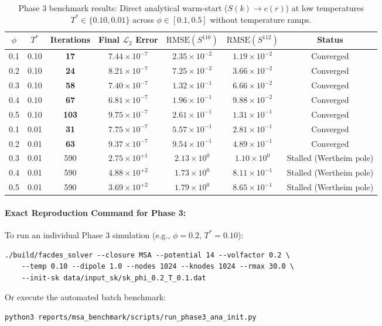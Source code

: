\documentclass[11pt,a4paper]{article}
\begin{document}
\begin{table}[htbp]
    \centering
    \caption{Phase 3 benchmark results: Direct analytical warm-start ($S(k) \to c(r)$) at low temperatures $T^* \in \{0.10, 0.01\}$ across $\phi \in [0.1, 0.5]$ without temperature ramps.}
    \label{tab:phase3_results}
    \vspace{2mm}
    \begin{tabular}{ccccccc}
        \hline\hline
        $\phi$ & $T^*$ & Iterations & Final $\mathcal{L}_2$ Error & $\text{RMSE}(S^{110})$ & $\text{RMSE}(S^{112})$ & Status \\
        \hline
        0.1 & 0.10 & \textbf{17}  & $7.44 \times 10^{-7}$ & $2.35 \times 10^{-2}$ & $1.19 \times 10^{-2}$ & Converged \\
        0.2 & 0.10 & \textbf{24}  & $8.21 \times 10^{-7}$ & $7.25 \times 10^{-2}$ & $3.66 \times 10^{-2}$ & Converged \\
        0.3 & 0.10 & \textbf{58}  & $7.40 \times 10^{-7}$ & $1.32 \times 10^{-1}$ & $6.66 \times 10^{-2}$ & Converged \\
        0.4 & 0.10 & \textbf{67}  & $6.81 \times 10^{-7}$ & $1.96 \times 10^{-1}$ & $9.88 \times 10^{-2}$ & Converged \\
        0.5 & 0.10 & \textbf{103} & $9.75 \times 10^{-7}$ & $2.61 \times 10^{-1}$ & $1.31 \times 10^{-1}$ & Converged \\
        \hline
        0.1 & 0.01 & \textbf{31}  & $7.75 \times 10^{-7}$ & $5.57 \times 10^{-1}$ & $2.81 \times 10^{-1}$ & Converged \\
        0.2 & 0.01 & \textbf{63}  & $9.37 \times 10^{-7}$ & $9.54 \times 10^{-1}$ & $4.89 \times 10^{-1}$ & Converged \\
        0.3 & 0.01 & 590 & $2.75 \times 10^{+1}$ & $2.13 \times 10^{0}$  & $1.10 \times 10^{0}$  & Stalled (Wertheim pole) \\
        0.4 & 0.01 & 590 & $4.88 \times 10^{+2}$ & $1.73 \times 10^{0}$  & $8.11 \times 10^{-1}$ & Stalled (Wertheim pole) \\
        0.5 & 0.01 & 590 & $3.69 \times 10^{+2}$ & $1.79 \times 10^{0}$  & $8.65 \times 10^{-1}$ & Stalled (Wertheim pole) \\
        \hline\hline
    \end{tabular}
\end{table}

\paragraph{Exact Reproduction Command for Phase 3:}
To run an individual Phase 3 simulation (e.g., $\phi = 0.2$, $T^* = 0.10$):
\begin{verbatim}
./build/facdes_solver --closure MSA --potential 14 --volfactor 0.2 \
    --temp 0.10 --dipole 1.0 --nodes 1024 --knodes 1024 --rmax 30.0 \
    --init-sk data/input_sk/sk_phi_0.2_T_0.1.dat
\end{verbatim}
Or execute the automated batch benchmark:
\begin{verbatim}
python3 reports/msa_benchmark/scripts/run_phase3_ana_init.py
\end{verbatim}
\end{document}
